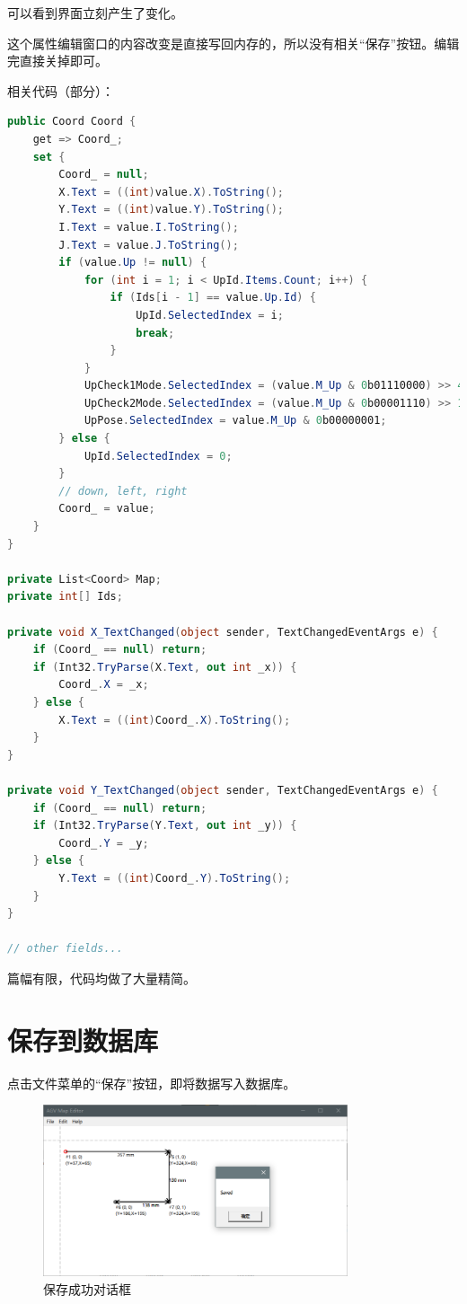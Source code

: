 可以看到界面立刻产生了变化。

这个属性编辑窗口的内容改变是直接写回内存的，所以没有相关``保存''按钮。编辑完直接关掉即可。

相关代码（部分）：

\begin{lstlisting}[language=cs]
public Coord Coord {
    get => Coord_;
    set {
        Coord_ = null;
        X.Text = ((int)value.X).ToString();
        Y.Text = ((int)value.Y).ToString();
        I.Text = value.I.ToString();
        J.Text = value.J.ToString();
        if (value.Up != null) {
            for (int i = 1; i < UpId.Items.Count; i++) {
                if (Ids[i - 1] == value.Up.Id) {
                    UpId.SelectedIndex = i;
                    break;
                }
            }
            UpCheck1Mode.SelectedIndex = (value.M_Up & 0b01110000) >> 4;
            UpCheck2Mode.SelectedIndex = (value.M_Up & 0b00001110) >> 1;
            UpPose.SelectedIndex = value.M_Up & 0b00000001;
        } else {
            UpId.SelectedIndex = 0;
        }
        // down, left, right
        Coord_ = value;
    }
}

private List<Coord> Map;
private int[] Ids;

private void X_TextChanged(object sender, TextChangedEventArgs e) {
    if (Coord_ == null) return;
    if (Int32.TryParse(X.Text, out int _x)) {
        Coord_.X = _x;
    } else {
        X.Text = ((int)Coord_.X).ToString();
    }
}

private void Y_TextChanged(object sender, TextChangedEventArgs e) {
    if (Coord_ == null) return;
    if (Int32.TryParse(Y.Text, out int _y)) {
        Coord_.Y = _y;
    } else {
        Y.Text = ((int)Coord_.Y).ToString();
    }
}

// other fields...
\end{lstlisting}

篇幅有限，代码均做了大量精简。

\section{保存到数据库}

点击文件菜单的``保存''按钮，即将数据写入数据库。

\begin{figure}[H]
  \centering
  \includegraphics[width=0.8\textwidth]{assets/save.png}
  \caption{保存成功对话框}
  \label{fig:save}
\end{figure}

